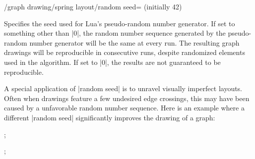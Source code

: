 \begin{key}{/graph drawing/spring layout/random seed= 
  (initially 42)}
  
  Specifies the seed used for Lua's pseudo-random number generator. If
  set to something other than |0|, the random number sequence generated
  by the pseudo-random number generator will be the same at every run.
  The resulting graph drawings will be reproducible in consecutive runs,
  despite randomized elements used in the algorithm.
  If set to |0|, the results are not guaranteed to be reproducible.
  
  A special application of |random seed| is to unravel visually
  imperfect layouts. Often when drawings feature a few undesired edge
  crossings, this may have been caused by a unfavorable random number
  sequence. Here is an example where a different |random seed| 
  significantly improves the drawing of a graph:
  \begin{codeexample}[width=6.0cm]
\tikz {};

\tikz {};
  \end{codeexample}
%
\end{key}

